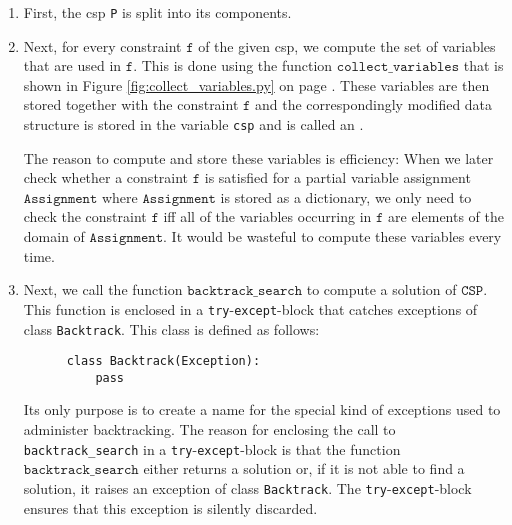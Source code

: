 \begin{enumerate}
\item First, the \ac{csp} \texttt{P} is split into its components.
\item Next, for every constraint $\texttt{f}$ of the given \ac{csp}, we compute the set of variables that
      are used in $\texttt{f}$.  This is done using the function $\texttt{collect\_variables}$ that is shown in
      Figure \ref{fig:collect_variables.py} on page \pageref{fig:collect_variables.py}.
      These variables are then stored together with the constraint $\texttt{f}$ and
      the correspondingly modified data structure is stored in the variable \texttt{csp} and is called an
      .

      The reason to compute and store these variables is efficiency: When we later check whether a constraint $\texttt{f}$
      is satisfied for a partial variable assignment $\texttt{Assignment}$ where $\texttt{Assignment}$ is
      stored as a dictionary, we only need to check the constraint $\texttt{f}$ iff all of the variables occurring
      in $\texttt{f}$ are elements of the domain of $\texttt{Assignment}$.   It would be wasteful to compute
      these variables every time.
\item Next, we call the function $\texttt{backtrack\_search}$ to compute a solution of $\texttt{CSP}$.
      This function is enclosed in a \texttt{try}-\texttt{except}-block that catches exceptions of class
      \texttt{Backtrack}.  This class is defined as follows:
      
\begin{verbatim}
      class Backtrack(Exception):
          pass
\end{verbatim}
      Its only purpose is to create a name for the special kind of exceptions used to administer backtracking.
      The reason for enclosing the call to \texttt{backtrack\_search} in a \texttt{try}-\texttt{except}-block
      is that the function $\texttt{backtrack\_search}$ either returns a solution or, if it is not
      able to find a solution, it raises an exception of class \texttt{Backtrack}.
      The \texttt{try}-\texttt{except}-block ensures that this exception is silently discarded.
\end{enumerate}

